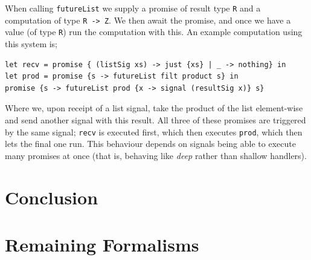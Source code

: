 \documentclass[msc,deptreport,cs]{infthesis} %
\newcommand{\code}[1]{\lstinline{#1}}
\begin{document}
\noindent When calling \code{futureList} we supply a promise of result type
\code{R} and a computation of type \code{R -> Z}. We then await the promise, and
once we have a value (of type \code{R}) run the computation with this. An
example computation using this system is;

\begin{lstlisting}
let recv = promise { (listSig xs) -> just {xs} | _ -> nothing} in
let prod = promise {s -> futureList filt product s} in
promise {s -> futureList prod {x -> signal (resultSig x)} s}
\end{lstlisting}

\noindent Where we, upon receipt of a list signal, take the product of the list
element-wise and send another signal with this result. All three of these
promises are triggered by the same signal; \code{recv} is executed first, which
then executes \code{prod}, which then lets the final one run. This behaviour
depends on signals being able to execute many promises at once (that is,
behaving like \emph{deep} rather than shallow handlers).




\chapter{Conclusion}








\appendix

\chapter{Remaining Formalisms}
\end{document}
